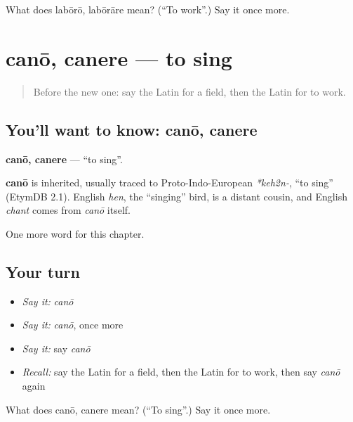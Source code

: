 \begin{tcolorbox}[breakable,colback=teal!4,colframe=teal!35!black,title={Before you move on}]
What does labōrō, labōrāre mean? (\textquotedblleft{}To work\textquotedblright{}.) Say it once more.
\end{tcolorbox}
\section[canō, canere]{canō, canere — to sing}

\label{lesson:LA-C75-cano}



\begin{quote}
Before the new one: say the Latin for a field, then the Latin for to work.
\end{quote}

\subsection*{You'll want to know: canō, canere}
\textbf{canō, canere} — \textquotedblleft{}to sing\textquotedblright{}.

\begin{cousinweb}
\textbf{canō} is inherited, usually traced to Proto-Indo-European \emph{*keh2n-}, \textquotedblleft{}to sing\textquotedblright{} (EtymDB 2.1). English \emph{hen}, the \textquotedblleft{}singing\textquotedblright{} bird, is a distant cousin, and English \emph{chant} comes from \emph{canō} itself.
\end{cousinweb}

\begin{grammarlens}[title={What you've built}]
One more word for this chapter.
\end{grammarlens}

\subsection*{Your turn}
\begin{itemize}
\raggedright
  \item \emph{Say it:} \emph{canō}
  \item \emph{Say it:} \emph{canō}, once more
  \item \emph{Say it:} say \emph{canō}
  \item \emph{Recall:} say the Latin for a field, then the Latin for to work, then say \emph{canō} again
\end{itemize}

\begin{tcolorbox}[breakable,colback=teal!4,colframe=teal!35!black,title={Before you move on}]
What does canō, canere mean? (\textquotedblleft{}To sing\textquotedblright{}.) Say it once more.
\end{tcolorbox}
